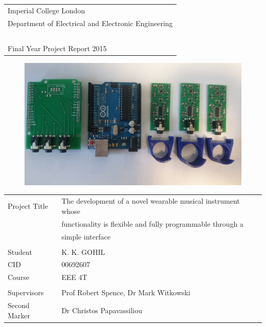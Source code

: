 \thispagestyle{empty}

\large
\begin{tabular}{|l}
Imperial College London\\
Department of Electrical and Electronic Engineering\\~\\
Final Year Project Report 2015
\end{tabular}

\vspace{80pt}
\begin{figure}[H]
   \centering
   \includegraphics[scale=0.1]{Images/paws_full} 
\end{figure}


\vfill

\begin{tabular}{| l l}
Project Title & The development of a novel wearable musical instrument whose \\
& functionality is flexible and fully programmable through a \\ & simple interface \\
&\\
Student & K. K. GOHIL \\ 
CID & 00692607 \\ 
Course & EEE 4T \\ &\\
Supervisors & Prof Robert Spence, Dr Mark Witkowski \\ 
Second Marker & Dr Christos Papavassiliou 
\end{tabular}
\normalsize
\newpage